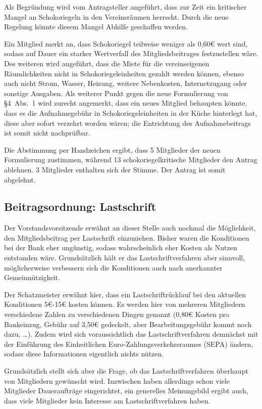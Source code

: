 \documentclass[a4paper,12pt]{scrartcl}
\begin{document}
Als Begründung wird vom Antragsteller angeführt, dass zur Zeit ein kritischer
Mangel an Schokoriegeln in den Vereinsräumen herrscht. Durch die neue Regelung
könnte diesem Mangel Abhilfe geschaffen werden.

Ein Mitglied merkt an, dass Schokoriegel teilweise weniger als 0,60€ wert sind,
sodass auf Dauer ein starker Wertverfall des Mitgliedsbeitrages festzustellen
wäre. Des weiteren wird angeführt, dass die Miete für die vereinseigenen
Räumlichkeiten nicht in Schokoriegeleinheiten gezahlt werden können, ebenso auch
nicht Strom, Wasser, Heizung, weitere Nebenkosten, Internetzugang oder sonstige
Ausgaben. Als weiterer Punkt gegen die neue Formulierung von §4~Abs.~1 wird
zurecht angemerkt, dass ein neues Mitglied behaupten könnte, dass es die
Aufnahmegebühr in Schokoriegeleinheiten in der Küche hinterlegt hat, diese aber
sofort verzehrt worden wären; die Entrichtung des Aufnahmebeitrags ist somit
nicht nachprüfbar.

Die Abstimmung per Handzeichen ergibt, dass 5 Mitglieder der neuen Formulierung
zustimmen, während 13 schokoriegelkritische Mitglieder den Antrag ablehnen. 3
Mitglieder enthalten sich der Stimme. Der Antrag ist somit abgelehnt.

\subsection{Beitragsordnung: Lastschrift}
Der Vorstandsvorsitzende erwähnt an dieser Stelle auch nochmal die Möglichkeit,
den Mitgliedsbeitrag per Lastschrift einzuziehen. Bisher waren die Konditionen
bei der Bank eher ungünstig, sodass wahrscheinlich eher Kosten als Nutzen
entstanden wäre. Grundsätzlich hält er das Lastschriftverfahren aber sinnvoll,
möglicherweise verbessern sich die Konditionen auch nach anerkannter
Gemeinnützigkeit.

Der Schatzmeister erwähnt hier, dass ein Lastschriftrücklauf bei den aktuellen
Konditionen 5€-15€ kosten können. Es werden hier von mehreren Mitgliedern
verschiedene Zahlen zu verschiedenen Dingen genannt (0{,}80€ Kosten pro
Bankeinzug, Gebühr auf 3{,}50€ gedeckelt, aber Bearbeitungsgebühr kommt noch
dazu, \ldots). Zudem wird sich voraussichtlich das Lastschriftverfahren
demnächst mit der Einführung des Einheitlichen Euro-Zahlungsverkehrsraumes
(SEPA) ändern, sodass diese Informationen eigentlich nichts nützen.

Grundsätzlich stellt sich aber die Frage, ob das Lastschriftverfahren überhaupt
von Mitgliedern gewünscht wird. Inzwischen haben allerdings schon viele
Mitglieder Daueraufträge eingerichtet, ein generelles Meinungsbild ergibt auch,
dass viele Mitglieder kein Interesse am Lastschriftverfahren haben.
\end{document}
